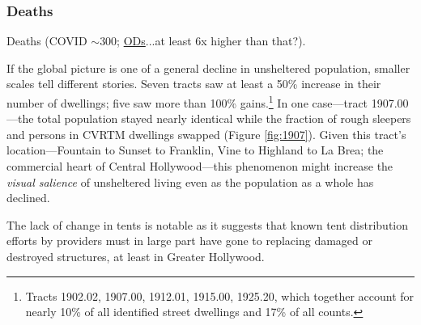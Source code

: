 \documentclass[11pt,twocolumn]{article}
\begin{document}
\subsubsection{Deaths}


Deaths (COVID $\sim$300; \href{http://publichealth.lacounty.gov/phcommon/public/media/mediapubhpdetail.cfm?prid=2900#:~:text=LOS\%20ANGELES\%20\%E2\%80\%93The\%20Los\%20Angeles,deaths\%20among\%20people\%20experiencing\%20homelessness.}{ODs}...at least 6x higher
than that?).

If the global picture is one of a general decline in unsheltered population, smaller scales tell different 
stories. Seven tracts saw at least a 50\% increase in their number of dwellings; five saw more than 100\% 
gains.\footnote{Tracts 1902.02, 1907.00, 1912.01, 1915.00, 1925.20, which together account for nearly 
10\% of all identified street dwellings and 17\% of all counts.} 
In one case---tract 1907.00---the total population stayed nearly identical while the fraction of rough sleepers
and persons in CVRTM dwellings swapped (Figure \ref{fig:1907}). Given this tract's location---Fountain
to Sunset to Franklin, Vine to Highland to La Brea; the commercial heart of Central Hollywood---this
phenomenon might increase the {\it visual salience} of unsheltered living even as the population as a 
whole has declined. 

The lack of change in tents is notable as it suggests that known tent distribution efforts by 
providers must in large part have gone to replacing damaged or destroyed structures, at least 
in Greater Hollywood.


\end{document}

